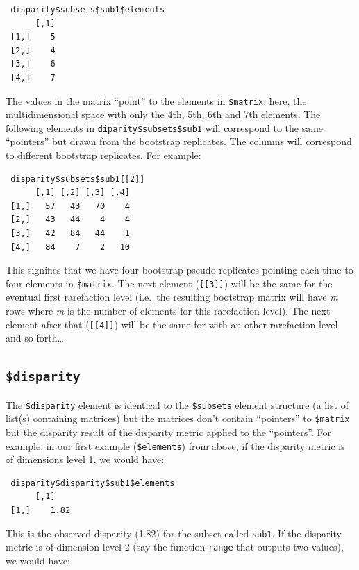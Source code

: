 \documentclass[]{book}
\theoremstyle{definition}
\theoremstyle{definition}
\theoremstyle{definition}
\theoremstyle{remark}
\begin{document}
\begin{verbatim}
 disparity$subsets$sub1$elements
      [,1]
 [1,]    5
 [2,]    4
 [3,]    6
 [4,]    7
\end{verbatim}

The values in the matrix ``point'' to the elements in \texttt{\$matrix}:
here, the multidimensional space with only the 4th, 5th, 6th and 7th
elements. The following elements in \texttt{diparity\$subsets\$sub1}
will correspond to the same ``pointers'' but drawn from the bootstrap
replicates. The columns will correspond to different bootstrap
replicates. For example:

\begin{verbatim}
 disparity$subsets$sub1[[2]]
      [,1] [,2] [,3] [,4]
 [1,]   57   43   70    4
 [2,]   43   44    4    4
 [3,]   42   84   44    1
 [4,]   84    7    2   10
\end{verbatim}

This signifies that we have four bootstrap pseudo-replicates pointing
each time to four elements in \texttt{\$matrix}. The next element
(\texttt{{[}{[}3{]}{]}}) will be the same for the eventual first
rarefaction level (i.e.~the resulting bootstrap matrix will have
\emph{m} rows where \emph{m} is the number of elements for this
rarefaction level). The next element after that (\texttt{{[}{[}4{]}{]}})
will be the same for with an other rarefaction level and so
forth\ldots{}

\subsection{\texorpdfstring{\texttt{\$disparity}}{\$disparity}}\label{disparity}

The \texttt{\$disparity} element is identical to the \texttt{\$subsets}
element structure (a list of list(s) containing matrices) but the
matrices don't contain ``pointers'' to \texttt{\$matrix} but the
disparity result of the disparity metric applied to the ``pointers''.
For example, in our first example (\texttt{\$elements}) from above, if
the disparity metric is of dimensions level 1, we would have:

\begin{verbatim}
 disparity$disparity$sub1$elements
      [,1]
 [1,]    1.82
\end{verbatim}

This is the observed disparity (1.82) for the subset called
\texttt{sub1}. If the disparity metric is of dimension level 2 (say the
function \texttt{range} that outputs two values), we would have:
\end{document}
